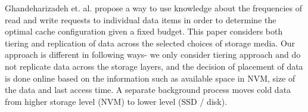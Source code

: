 Ghandeharizadeh et. al. \cite{c2} propose a way to use knowledge about the frequencies of read and write requests to individual data items in order to determine the optimal cache configuration given a fixed budget. This paper considers both tiering and replication of data across the selected choices of storage media. Our approach is different in following ways- we only consider tiering approach and do not replicate data across the storage layers, and the decision of placement of data is done online based on the information such as available space in NVM, size of the data and last access time. A separate background process moves cold data from higher storage level (NVM) to lower level (SSD / disk).
 
